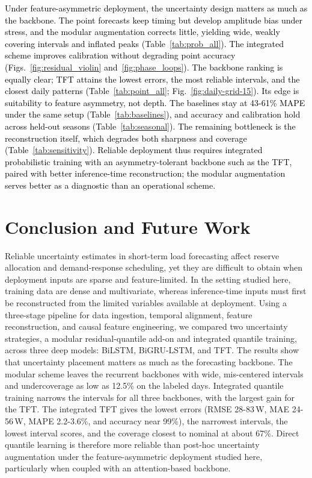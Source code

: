 \documentclass[final,10pt,1p,authoryear]{elsarticle}
\makeatletter
\def\subsubsection{\@startsection{subsubsection}{3}{\z@}{0.5ex plus 0.1ex minus 0.1ex}{1ex plus 0.1ex}{\normalfont\normalsize\itshape}}
\theoremstyle{definition}
\makeatother
\begin{document}
\subsubsection{Remarks and Implications}
\textcolor{black}{Under feature-asymmetric deployment, the uncertainty design matters as much as the backbone. The point forecasts keep timing but develop amplitude bias under stress, and the modular augmentation corrects little, yielding wide, weakly covering intervals and inflated peaks (Table~\ref{tab:prob_all}). The integrated scheme improves calibration without degrading point accuracy (Figs.~\ref{fig:residual_violin} and~\ref{fig:phase_loops}). The backbone ranking is equally clear; TFT attains the lowest errors, the most reliable intervals, and the closest daily patterns (Table~\ref{tab:point_all}; Fig.~\ref{fig:daily-grid-15}). Its edge is suitability to feature asymmetry, not depth. The baselines stay at 43-61\% MAPE under the same setup (Table~\ref{tab:baselines}), and accuracy and calibration hold across held-out seasons (Table~\ref{tab:seasonal}). The remaining bottleneck is the reconstruction itself, which degrades both sharpness and coverage (Table~\ref{tab:sensitivity}). Reliable deployment thus requires integrated probabilistic training with an asymmetry-tolerant backbone such as the TFT, paired with better inference-time reconstruction; the modular augmentation serves better as a diagnostic than an operational scheme.}

\section{Conclusion and Future Work}\label{conc}
Reliable uncertainty estimates in short-term load forecasting affect reserve allocation and demand-response scheduling, yet they are difficult to obtain when deployment inputs are sparse and feature-limited. In the setting studied here, training data are dense and multivariate, whereas inference-time inputs must first be reconstructed from the limited variables available at deployment. Using a three-stage pipeline for data ingestion, temporal alignment, feature reconstruction, and causal feature engineering, we compared two uncertainty strategies, a modular residual-quantile add-on and integrated quantile training, across three deep models: BiLSTM, BiGRU-LSTM, and TFT. The results show that uncertainty placement matters as much as the forecasting backbone. The modular scheme leaves the recurrent backbones with wide, mis-centered intervals and undercoverage as low as 12.5\% on the labeled days. Integrated quantile training narrows the intervals for all three backbones, with the largest gain for the TFT. The integrated TFT gives the lowest errors (RMSE 28-83\,W, MAE 24-56\,W, MAPE 2.2-3.6\%, and accuracy near 99\%), the narrowest intervals, the lowest interval scores, and the coverage closest to nominal at about 67\%. Direct quantile learning is therefore more reliable than post-hoc uncertainty augmentation under the feature-asymmetric deployment studied here, particularly when coupled with an attention-based backbone.
\end{document}

